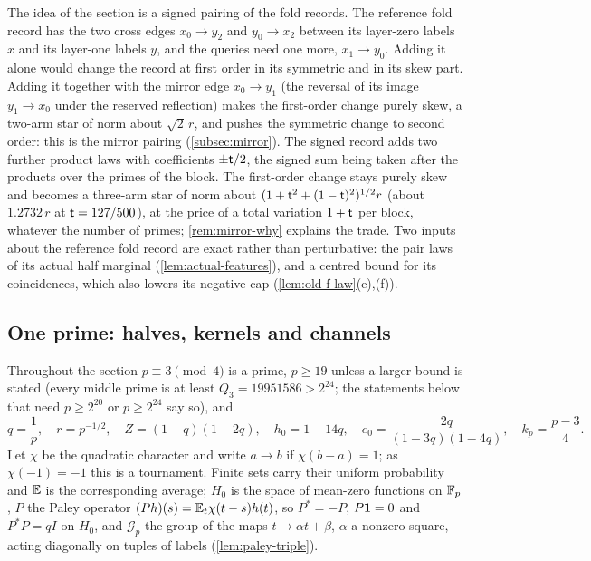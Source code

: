 The idea of the section is a signed pairing of the fold records. The
reference fold record has the two cross edges $x_0\to y_2$ and $y_0\to x_2$
between its layer-zero labels $x$ and its layer-one labels $y$, and the
queries need one more, $x_1\to y_0$. Adding it alone would change the record
at first order in its symmetric and in its skew part. Adding it together with
the mirror edge $x_0\to y_1$ (the reversal of its image $y_1\to x_0$ under the
reserved reflection) makes the first-order change purely skew, a two-arm star
of norm about $\sqrt2\,r$, and pushes the symmetric change to second order:
this is the mirror pairing (\cref{subsec:mirror}). The signed record adds two
further product laws with coefficients $\pm\mathsf t/2$, the signed sum being
taken after the products over the primes of the block. The first-order change
stays purely skew and becomes a three-arm star of norm about
$(1+\mathsf t^2+(1-\mathsf t)^2)^{1/2}r$ (about $1.2732\,r$ at $\mathsf t=127/500$), at the
price of a total variation $1+\mathsf t$ per block, whatever the number of primes;
\cref{rem:mirror-why} explains the trade. Two inputs about the reference fold
record are exact rather than perturbative: the pair laws of its actual half
marginal (\cref{lem:actual-features}), and a centred bound for its
coincidences, which also lowers its negative cap
(\cref{lem:old-f-law}(e),(f)).

\subsection{One prime: halves, kernels and channels}
\label{subsec:middle-records:notation}

Throughout the section $p\equiv3\pmod4$ is a prime, $p\ge19$ unless a larger
bound is stated (every middle prime is at least $Q_3=19951586>2^{24}$; the
statements below that need $p\ge2^{20}$ or $p\ge2^{24}$ say so), and
\[
 q=\frac1p,\quad r=p^{-1/2},\quad Z=(1-q)(1-2q),\quad h_0=1-14q,\quad
 e_0=\frac{2q}{(1-3q)(1-4q)},\quad k_p=\frac{p-3}4 .
\]
Let $\chi$ be the quadratic character and write $a\to b$ if $\chi(b-a)=1$; as
$\chi(-1)=-1$ this is a tournament. Finite sets carry their uniform
probability and $\mathbb E$ is the corresponding average; $H_0$ is the space of
mean-zero functions on $\mathbb F_p$, $P$ the Paley operator
$(Ph)(s)=\mathbb E_t\chi(t-s)h(t)$, so $P^*=-P$, $P\mathbf 1=0$ and $P^*P=qI$ on $H_0$, and
$\mathcal G_p$ the group of the maps $t\mapsto\alpha t+\beta$, $\alpha$ a nonzero
square, acting diagonally on tuples of labels (\cref{lem:paley-triple}).


